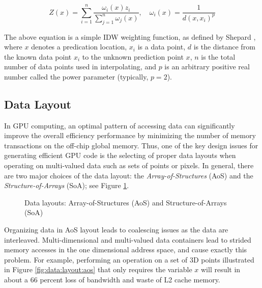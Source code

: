 \begin{equation}
\label{eq1}
Z(x)=\sum\limits_{i=1}^n {\frac{\omega _i (x)z_i }{\sum\limits_{j=1}^n 
{\omega _j (x)} }} ,
\quad
\omega _i (x)=\frac{1}{d(x,x_i )^p}
\end{equation}

The above equation is a simple IDW weighting function, as defined by 
Shepard \cite{shepard1968}, where $x$ denotes a predication location, $x_{i }$ is a data 
point, $d$ is the distance from the known data point $x_{i}$ to the unknown 
prediction point $x$, $n$ is the total number of data points used in 
interpolating, and $p$ is an arbitrary positive real number called the power 
parameter (typically, $p = 2$).


\subsection{Data Layout}
\label{sec:back:layout}

In GPU computing, an optimal pattern of accessing data can significantly 
improve the overall efficiency performance by minimizing the number of 
memory transactions on the off-chip global memory. Thus, one of the key 
design issues for generating efficient GPU code is the selecting of proper 
data layouts when operating on multi-valued data such as sets of points or 
pixels. In general, there are two major choices of the data layout: the 
\textit{Array-of-Structures} (AoS) and the \textit{Structure-of-Arrays} (SoA); see Figure \ref{fig:data:layout}. 

\begin{figure}[htb]
    \centering
    \hspace{1em}
    \caption{Data layouts: Array-of-Structures (AoS) and Structure-of-Arrays (SoA)}
    \label{fig:data:layout}       \end{figure}

Organizing data in AoS layout leads to coalescing issues as the data are 
interleaved. Multi-dimensional and multi-valued data containers lead to 
strided memory accesses in the one dimensional address space, and cause 
exactly this problem. For example, performing an operation on a set of 3D 
points illustrated in Figure \ref{fig:data:layout:aos} that only requires the variable $x$ will 
result in about a 66 percent loss of bandwidth and waste of L2 cache memory.

